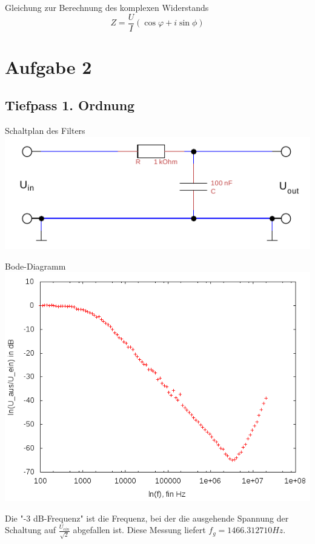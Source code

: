 \documentclass[compress,11pt]{beamer}
\begin{document}
\begin{frame}
Gleichung zur Berechnung des komplexen Widerstands
\begin{equation}
Z=\frac{U}{I}(\cos \varphi +i \sin \phi)
\end{equation}
\end{frame}

\section{Aufgabe 2}
\subsection{Tiefpass 1. Ordnung}
\begin{frame}
\begin{block}{Schaltplan des Filters}
\includegraphics[width=\textwidth]{../daten/Messdaten/plots/schalt_tief}
\end{block}
\end{frame}
\begin{frame}\begin{block}{Bode-Diagramm}
\centering
\includegraphics[width=.85\textwidth]{../daten/Messdaten/plots/Aufgabe2Bodediagramm_tief_gain}
\end{block}
\end{frame}
\begin{frame}
Die "-3 dB-Frequenz" ist die Frequenz, bei der die ausgehende Spannung der Schaltung auf $\frac{U_{ein}}{\sqrt{2}}$ abgefallen ist. Diese Messung liefert $f_g = 1466.312710 Hz$.
\end{frame}
\end{document}
